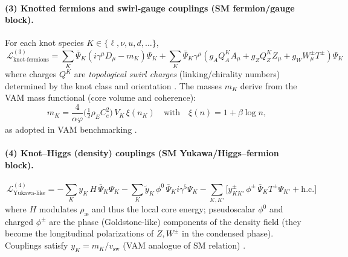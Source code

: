 \documentclass[11pt]{article}
\begin{document}
    \paragraph{(3) Knotted fermions and swirl-gauge couplings (SM fermion/gauge block).}
    For each knot species \(K\in\{\ell,\nu,u,d,\dots\}\),
    \[
        \boxed{\ \mathcal{L}^{(3)}_{\text{knot-fermions}}=
            \sum_{K}\bar{\Psi}_K\!\left(i\gamma^\mu D_\mu - m_K\right)\!\Psi_K
            +\sum_{K} \bar{\Psi}_K \gamma^\mu\left( g_A Q_A^K A_\mu + g_Z Q_Z^K Z_\mu + g_W W_\mu^\pm T^\pm\right)\Psi_K\ }
    \]
    where charges \(Q^K\) are \emph{topological swirl charges} (linking/chirality numbers) determined by the knot class and orientation \cite{Iskandarani2025TopLag,Iskandarani2025KnottedGauge}.
    The masses \(m_K\) derive from the VAM mass functional (core volume and coherence):
    \[
        m_K=\frac{4}{\alpha\varphi}\Big(\tfrac{1}{2}\rho_{\!E} C_e^2\Big)\, V_K \,\xi(n_K)
        \quad\text{with}\quad \xi(n)=1+\beta \log n,
    \]
    as adopted in VAM benchmarking \cite{Iskandarani2025Master,Iskandarani2025Benchmark}.

    \paragraph{(4) Knot–Higgs (density) couplings (SM Yukawa/Higgs–fermion block).}
    \[
        \boxed{\ \mathcal{L}^{(4)}_{\text{Yukawa-like}}=
            -\sum_{K} y_K\, H\, \bar{\Psi}_K \Psi_K
            -\sum_{K} \tilde{y}_K \,\phi^0\, \bar{\Psi}_K i\gamma^5 \Psi_K
            -\sum_{K,K'} \big[ y_{KK'}^\pm\, \phi^\pm\, \bar{\Psi}_K T^\pm \Psi_{K'} + \text{h.c.}\big]\ }
    \]
    where \(H\) modulates \(\rho_\text{\ae}\) and thus the local core energy; pseudoscalar \(\phi^0\) and charged \(\phi^\pm\) are the phase (Goldstone-like) components of the density field (they become the longitudinal polarizations of \(Z,W^\pm\) in the condensed phase).
    Couplings satisfy \(y_K = m_K/v_\text{sw}\) (VAM analogue of SM relation) \cite{Iskandarani2025Master,Iskandarani2025TopLag}.

\end{document}
